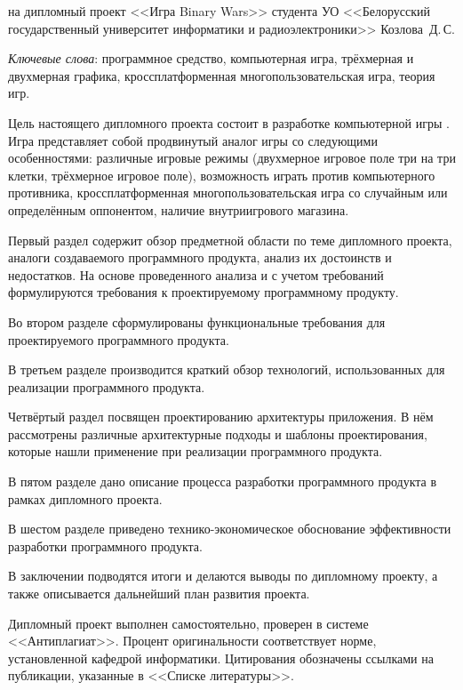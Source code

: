 




\thispagestyle{empty}

\begin{center}
    \begin{minipage}{0.84\textwidth}
        на дипломный проект <<Игра Bi\-na\-ry Wars>> студента УО <<Белорусский государственный университет информатики и радиоэлектроники>> Козлова~Д.\,С.
    \end{minipage}
\end{center}

\emph{Ключевые слова}: программное средство, компьютерная игра, трёхмерная и двухмерная графика, кроссплатформенная многопользовательская игра, теория игр.

\vspace{1\parsep}

Цель настоящего дипломного проекта состоит в разработке компьютерной игры \BinaryWars. Игра представляет собой продвинутый аналог игры \TicTacToe со следующими особенностями: различные игровые режимы (двухмерное игровое поле три на три клетки, трёхмерное игровое поле), возможность играть против компьютерного противника, кроссплатформенная многопользовательская игра со случайным или определённым оппонентом, наличие внутриигрового магазина.

Первый раздел содержит обзор предметной области по теме дипломного проекта, аналоги создаваемого программного продукта, анализ их достоинств и недостатков. На основе проведенного анализа и с учетом требований формулируются требования к проектируемому программному продукту.

Во втором разделе сформулированы функциональные требования для проектируемого программного продукта.

В третьем разделе производится краткий обзор технологий, использованных для реализации программного продукта.

Четвёртый раздел посвящен проектированию архитектуры приложения. В нём рассмотрены различные архитектурные подходы и шаблоны проектирования, которые нашли применение при реализации программного продукта.

В пятом разделе дано описание процесса разработки программного продукта в рамках дипломного проекта.

В шестом разделе приведено технико-экономическое обоснование эффективности разработки программного продукта.

В заключении подводятся итоги и делаются выводы по дипломному проекту, а также описывается дальнейший план развития проекта.

Дипломный проект выполнен самостоятельно, проверен в системе <<Антиплагиат>>. Процент оригинальности соответствует норме, установленной кафедрой информатики. Цитирования обозначены ссылками на публикации, указанные в <<Списке литературы>>.

